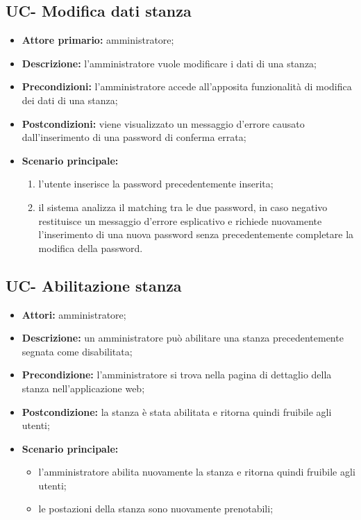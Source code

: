 \subsection{UC- Modifica dati stanza}
\begin{itemize}
	\item \textbf{Attore primario:} amministratore;
	\item\textbf{Descrizione:} l'amministratore vuole modificare i dati di una stanza;
	\item\textbf{Precondizioni:} l'amministratore accede all'apposita funzionalità di modifica dei dati di una stanza;
	\item\textbf{Postcondizioni:} viene visualizzato un messaggio d'errore causato dall'inserimento di una password di conferma errata;
	\item \textbf{Scenario principale:}
	      \begin{enumerate}
		      \item l'utente inserisce la password precedentemente inserita;
		      \item il sistema analizza il matching tra le due password, in caso negativo restituisce un messaggio d'errore esplicativo e richiede nuovamente l'inserimento di una nuova password senza precedentemente completare la modifica della password.
	      \end{enumerate}
\end{itemize}



\subsection{UC- Abilitazione stanza}
\begin{itemize}
    \item \textbf{Attori:} amministratore;
    \item \textbf{Descrizione:} un amministratore pu\`{o} abilitare una stanza precedentemente segnata come disabilitata;
    \item \textbf{Precondizione:} l'amministratore si trova nella pagina di dettaglio della stanza nell'applicazione web;
    \item \textbf{Postcondizione:} la stanza \`{e} stata abilitata e ritorna quindi fruibile agli utenti;
    \item \textbf{Scenario principale:}
    \begin{itemize}
        \item l'amministratore abilita nuovamente la stanza e ritorna quindi fruibile agli utenti;
        \item le postazioni della stanza sono nuovamente prenotabili;
    \end{itemize}
\end{itemize}



